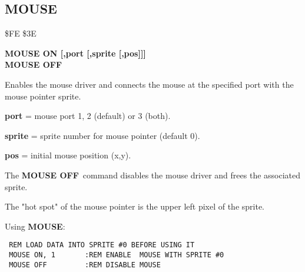 \subsection{MOUSE}
\begin{description}[leftmargin=2cm,style=nextline]
\item [Token:] \$FE \$3E
\item [Format:] {\bf MOUSE ON [,port [,sprite [,pos]]]} \\
                {\bf MOUSE OFF}
\item [Usage:]  Enables the mouse driver
                and connects the mouse at the specified port
                with the mouse pointer sprite.

                {\bf port} = mouse port 1, 2 (default) or 3 (both).

                {\bf sprite} = sprite number for mouse pointer (default 0).

                {\bf pos} = initial mouse position (x,y).

                The {\bf MOUSE OFF} command disables the mouse
                driver and frees the associated sprite.

\item [Remarks:] The "hot spot" of the mouse pointer is the upper left
                pixel of the sprite.

\item [Example:] Using {\bf MOUSE}:
\begin{tcolorbox}[colback=black,coltext=white]
\verbatimfont{\codefont}
\begin{verbatim}
 REM LOAD DATA INTO SPRITE #0 BEFORE USING IT
 MOUSE ON, 1       :REM ENABLE  MOUSE WITH SPRITE #0
 MOUSE OFF         :REM DISABLE MOUSE
\end{verbatim}
\end{tcolorbox}
\end{description}


\newpage
